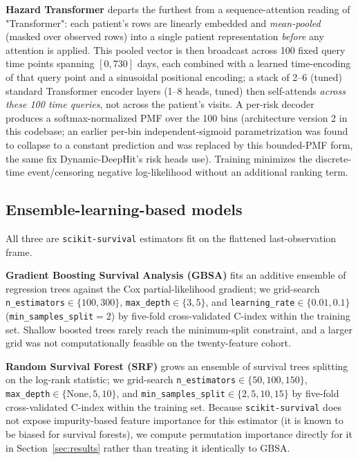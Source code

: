 \textbf{Hazard Transformer} \citep{hazard_transformer,vaswani2017attention} departs the furthest from a sequence-attention reading of "Transformer": each patient's rows are linearly embedded and \emph{mean-pooled} (masked over observed rows) into a single patient representation \emph{before} any attention is applied. This pooled vector is then broadcast across 100 fixed query time points spanning $[0,730]$ days, each combined with a learned time-encoding of that query point and a sinusoidal positional encoding; a stack of 2--6 (tuned) standard Transformer encoder layers (1--8 heads, tuned) then self-attends \emph{across these 100 time queries}, not across the patient's visits. A per-risk decoder produces a softmax-normalized PMF over the 100 bins (architecture version 2 in this codebase; an earlier per-bin independent-sigmoid parametrization was found to collapse to a constant prediction and was replaced by this bounded-PMF form, the same fix Dynamic-DeepHit's risk heads use). Training minimizes the discrete-time event/censoring negative log-likelihood without an additional ranking term.

\subsection{Ensemble-learning-based models}
All three are \texttt{scikit-survival} \citep{polsterl2020sksurv} estimators fit on the flattened last-observation frame.

\textbf{Gradient Boosting Survival Analysis (GBSA)} \citep{chen2013gradient_GBSA} fits an additive ensemble of regression trees against the Cox partial-likelihood gradient; we grid-search \texttt{n\_estimators}$\in\{100,300\}$, \texttt{max\_depth}$\in\{3,5\}$, and \texttt{learning\_rate}$\in\{0.01,0.1\}$ (\texttt{min\_samples\_split}$=2$) by five-fold cross-validated C-index within the training set. Shallow boosted trees rarely reach the minimum-split constraint, and a larger grid was not computationally feasible on the twenty-feature cohort.

\textbf{Random Survival Forest (SRF)} \citep{pickett2021random_survival_forests,ishwaran2008random} grows an ensemble of survival trees splitting on the log-rank statistic; we grid-search \texttt{n\_estimators}$\in\{50,100,150\}$, \texttt{max\_depth}$\in\{\text{None},5,10\}$, and \texttt{min\_samples\_split}$\in\{2,5,10,15\}$ by five-fold cross-validated C-index within the training set. Because \texttt{scikit-survival} does not expose impurity-based feature importance for this estimator (it is known to be biased for survival forests), we compute permutation importance directly for it in Section~\ref{sec:results} rather than treating it identically to GBSA.


